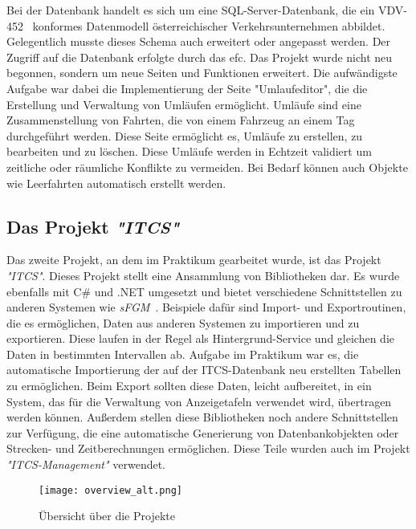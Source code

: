     Bei der Datenbank
    handelt es sich um eine SQL-Server-Datenbank, die ein VDV-452~\cite{VDV452} konformes
    Datenmodell österreichischer Verkehrsunternehmen abbildet. Gelegentlich musste dieses
    Schema auch erweitert oder angepasst werden. Der Zugriff auf die Datenbank erfolgte durch das \gls{efc}. 
    Das Projekt wurde nicht neu begonnen, sondern  um neue Seiten und Funktionen erweitert.
    Die aufwändigste Aufgabe war dabei die Implementierung der Seite "Umlaufeditor", die die Erstellung und Verwaltung von Umläufen ermöglicht. 
    Umläufe sind eine Zusammenstellung von Fahrten, die von einem Fahrzeug an einem Tag durchgeführt werden.
    Diese Seite ermöglicht es, Umläufe zu erstellen, zu bearbeiten und zu löschen. Diese Umläufe werden in Echtzeit validiert um zeitliche oder räumliche Konflikte zu vermeiden. Bei 
    Bedarf können auch Objekte wie Leerfahrten automatisch erstellt werden.

\subsection{Das Projekt \emph{"ITCS"}}\label{sec:itcs}
    Das zweite Projekt, an dem im Praktikum gearbeitet wurde, ist das Projekt \emph{"ITCS"}. Dieses Projekt stellt eine Ansammlung von Bibliotheken dar.
    Es wurde ebenfalls mit C\# und .NET umgesetzt und bietet verschiedene Schnittstellen zu anderen Systemen wie \emph{sFGM}~\cite{sFGM}.
    Beispiele dafür sind Import- und Exportroutinen, die es ermöglichen, Daten aus anderen Systemen zu importieren und zu exportieren. Diese laufen in der Regel als Hintergrund-Service und gleichen die Daten in
    bestimmten Intervallen ab. Aufgabe im Praktikum war es, die automatische 
    Importierung der auf der ITCS-Datenbank neu erstellten Tabellen zu ermöglichen. Beim Export sollten diese Daten, leicht aufbereitet, in ein System, das für die Verwaltung von 
    Anzeigetafeln verwendet wird, übertragen werden können. Außerdem stellen diese Bibliotheken noch andere Schnittstellen zur Verfügung, die eine automatische Generierung
    von Datenbankobjekten oder Strecken- und Zeitberechnungen ermöglichen. Diese Teile wurden auch im Projekt \emph{"ITCS-Management"} verwendet.
    \begin{figure}[H]
        \centering
        \texttt{[image: overview\_alt.png]}
        \caption{Übersicht über die Projekte}
        \label{fig:VTs}
    \end{figure}

